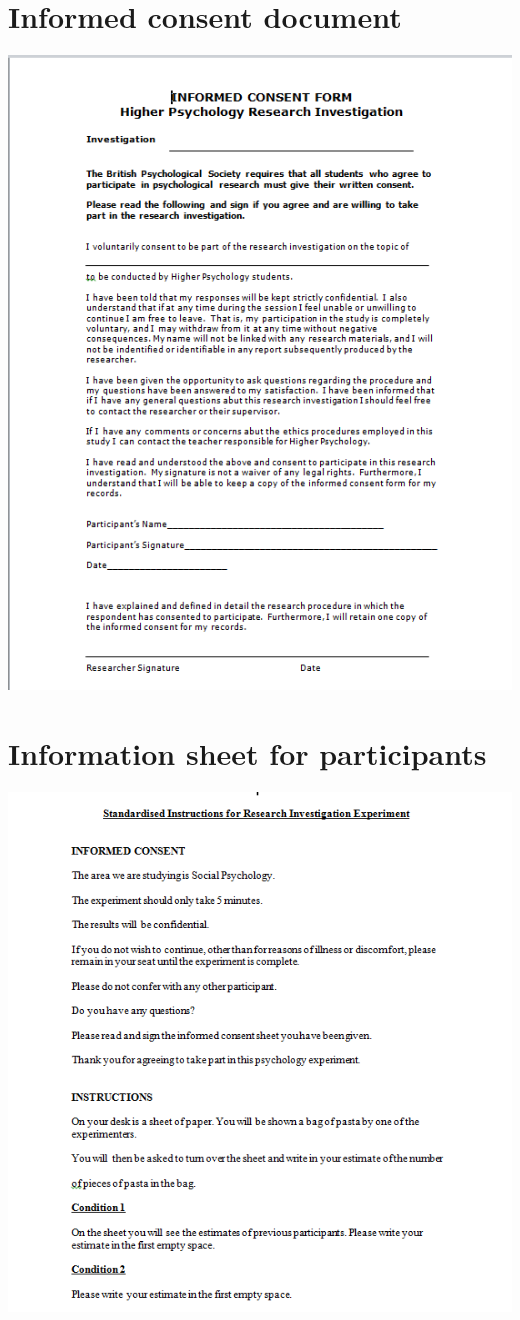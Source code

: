 \documentclass{report}
\begin{document}
\chapter{Informed consent document}
\includegraphics[width=\textwidth]{psych4}
\chapter{Information sheet for participants}
\includegraphics[width=\textwidth]{psych5}
\end{document}
